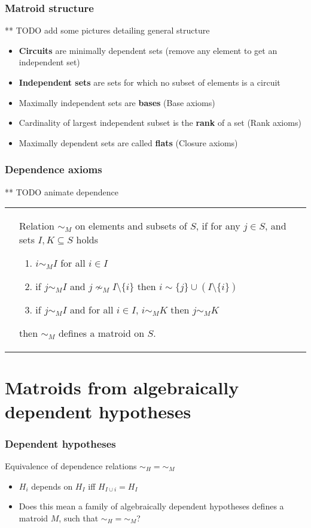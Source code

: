 \documentclass[bigger]{beamer}
\providecommand{\alert}[1]{\textbf{#1}}
\begin{document}
\begin{frame}
  \frametitle{Matroid structure}

** TODO add some pictures detailing general structure

  \begin{itemize}
  \item \alert{Circuits} are minimally dependent sets (remove any element to
    get an independent set)
  \item \alert{Independent sets} are sets for which no subset of elements is a
    circuit
  \item Maximally independent sets are \alert{bases} (Base axioms)
  \item Cardinality of largest independent subset is the \alert{rank} of a set
    (Rank axioms)
  \item Maximally dependent sets are called \alert{flats} (Closure axioms)
  \end{itemize}
\end{frame}


\begin{frame}
\frametitle{Dependence axioms}
** TODO animate dependence
\begin{tabular}{ll}
 \begin{minipage}{.4\textwidth}
   
 \end{minipage} &
 \begin{minipage}{.6\textwidth}
 Relation $\sim_M$ on elements and subsets of $S$,
 if for any $j \in S$, and sets $I,K \subseteq S$ holds
 \begin{enumerate}
 \item $i \sim_M I$ for all $i \in I$
 \item if $j \sim_M I$ and $j \nsim_M I\setminus \{i\}$
   then $i \sim \{j\} \cup (I \setminus \{i\})$
 \item if $j \sim_M I$ and for all $i \in I$, $i \sim_M K$ then $j \sim_M K$
 \end{enumerate}
 then $\sim_M$ defines a matroid on $S$.
 \end{minipage}
\end{tabular}



\end{frame}

\section{Matroids from algebraically dependent hypotheses}
\begin{frame}
 \frametitle{Dependent hypotheses}
 \begin{block}{Equivalence of dependence relations $\sim_H = \sim_M$}
   \begin{itemize}
   \item<1-> $H_i$ depends on $H_I$ iff $H_{I \cup i} = H_{I}$
   \item<2-> Does this mean a family of algebraically dependent
     hypotheses defines a matroid $M$, such that $\sim_H = \sim_M$?
   \end{itemize}
 \end{block}
\end{frame}
\end{document}
